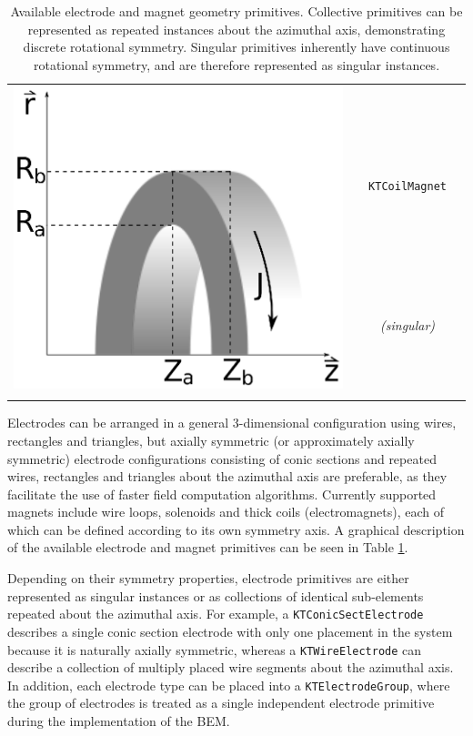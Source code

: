 \documentclass[11pt,a4paper,oneside]{article}
\begin{document}
\begin{table}
\begin{tabular}{|c|c||c|c|}
\multirow{3}{*}{\includegraphics[scale=.18]{coil.ps}} \\
\texttt{KTRectangleElectrode} & & \texttt{KTCoilMagnet} & \\
\it{(collective)}& & \it{(singular)} & \\
& & & \\
\hline
\end{tabular}
\caption{Available electrode and magnet geometry primitives.  Collective primitives can be represented as repeated instances about the azimuthal axis, demonstrating discrete rotational symmetry.  Singular primitives inherently have continuous rotational symmetry, and are therefore represented  as singular instances.}
\label{primitiveTable}
\end{table}
%
Electrodes can be arranged in a general 3-dimensional configuration using wires, rectangles and triangles, but axially symmetric (or approximately axially symmetric) electrode configurations consisting of conic sections and repeated wires, rectangles and triangles about the azimuthal axis are preferable, as they facilitate the use of faster field computation algorithms.  Currently supported magnets include wire loops, solenoids and thick coils (electromagnets), each of which can be defined according to its own symmetry axis.  A graphical description of the available electrode and magnet primitives can be seen in Table \ref{primitiveTable}.

Depending on their symmetry properties, electrode primitives are either represented as singular instances or as collections of identical sub-elements repeated about the azimuthal axis.  For example, a \texttt{KTConicSectElectrode} describes a single conic section electrode with only one placement in the system because it is naturally axially symmetric, whereas a \texttt{KTWireElectrode} can describe a collection of multiply placed wire segments about the azimuthal axis.  In addition, each electrode type can be placed into a \texttt{KTElectrodeGroup}, where the group of electrodes is treated as a single independent electrode primitive during the implementation of the BEM.  
\end{document}
